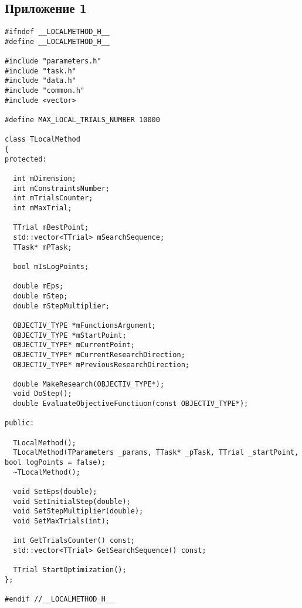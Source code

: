 \subsection{Приложение 1}
\label{attach1}
\begin{lstlisting}[frame=single]
#ifndef __LOCALMETHOD_H__
#define __LOCALMETHOD_H__

#include "parameters.h"
#include "task.h"
#include "data.h"
#include "common.h"
#include <vector>

#define MAX_LOCAL_TRIALS_NUMBER 10000

class TLocalMethod
{
protected:

  int mDimension;
  int mConstraintsNumber;
  int mTrialsCounter;
  int mMaxTrial;

  TTrial mBestPoint;
  std::vector<TTrial> mSearchSequence;
  TTask* mPTask;

  bool mIsLogPoints;

  double mEps;
  double mStep;
  double mStepMultiplier;

  OBJECTIV_TYPE *mFunctionsArgument;
  OBJECTIV_TYPE *mStartPoint;
  OBJECTIV_TYPE* mCurrentPoint;
  OBJECTIV_TYPE* mCurrentResearchDirection;
  OBJECTIV_TYPE* mPreviousResearchDirection;

  double MakeResearch(OBJECTIV_TYPE*);
  void DoStep();
  double EvaluateObjectiveFunctiuon(const OBJECTIV_TYPE*);

public:

  TLocalMethod();
  TLocalMethod(TParameters _params, TTask* _pTask, TTrial _startPoint, bool logPoints = false);
  ~TLocalMethod();

  void SetEps(double);
  void SetInitialStep(double);
  void SetStepMultiplier(double);
  void SetMaxTrials(int);

  int GetTrialsCounter() const;
  std::vector<TTrial> GetSearchSequence() const;

  TTrial StartOptimization();
};

#endif //__LOCALMETHOD_H__
\end{lstlisting}

